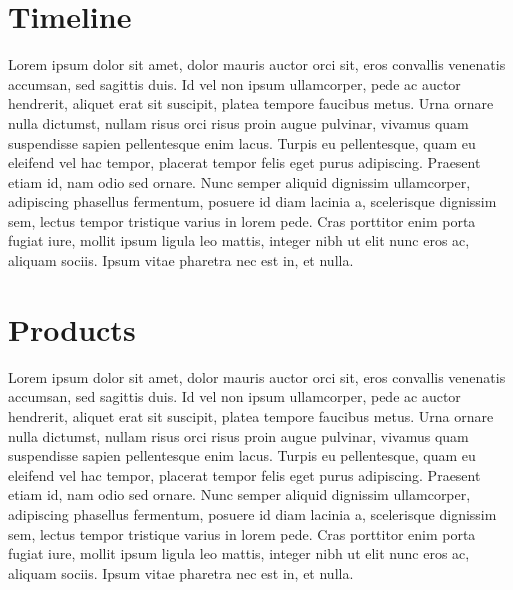 \documentclass[letterpaper,10pt,openany,oneside,english]{sphinxmanual}
\begin{document}
\section{Timeline}
\label{\detokenize{timeline:timeline}}\label{\detokenize{timeline::doc}}
Lorem ipsum dolor sit amet, dolor mauris auctor orci sit, eros convallis venenatis accumsan, sed sagittis duis. Id vel non ipsum ullamcorper, pede ac auctor hendrerit, aliquet erat sit suscipit, platea tempore faucibus metus. Urna ornare nulla dictumst, nullam risus orci risus proin augue pulvinar, vivamus quam suspendisse sapien pellentesque enim lacus. Turpis eu pellentesque, quam eu eleifend vel hac tempor, placerat tempor felis eget purus adipiscing. Praesent etiam id, nam odio sed ornare. Nunc semper aliquid dignissim ullamcorper, adipiscing phasellus fermentum, posuere id diam lacinia a, scelerisque dignissim sem, lectus tempor tristique varius in lorem pede. Cras porttitor enim porta fugiat iure, mollit ipsum ligula leo mattis, integer nibh ut elit nunc eros ac, aliquam sociis. Ipsum vitae pharetra nec est in, et nulla.


\section{Products}
\label{\detokenize{product:products}}\label{\detokenize{product::doc}}
Lorem ipsum dolor sit amet, dolor mauris auctor orci sit, eros convallis venenatis accumsan, sed sagittis duis. Id vel non ipsum ullamcorper, pede ac auctor hendrerit, aliquet erat sit suscipit, platea tempore faucibus metus. Urna ornare nulla dictumst, nullam risus orci risus proin augue pulvinar, vivamus quam suspendisse sapien pellentesque enim lacus. Turpis eu pellentesque, quam eu eleifend vel hac tempor, placerat tempor felis eget purus adipiscing. Praesent etiam id, nam odio sed ornare. Nunc semper aliquid dignissim ullamcorper, adipiscing phasellus fermentum, posuere id diam lacinia a, scelerisque dignissim sem, lectus tempor tristique varius in lorem pede. Cras porttitor enim porta fugiat iure, mollit ipsum ligula leo mattis, integer nibh ut elit nunc eros ac, aliquam sociis. Ipsum vitae pharetra nec est in, et nulla.
\end{document}

